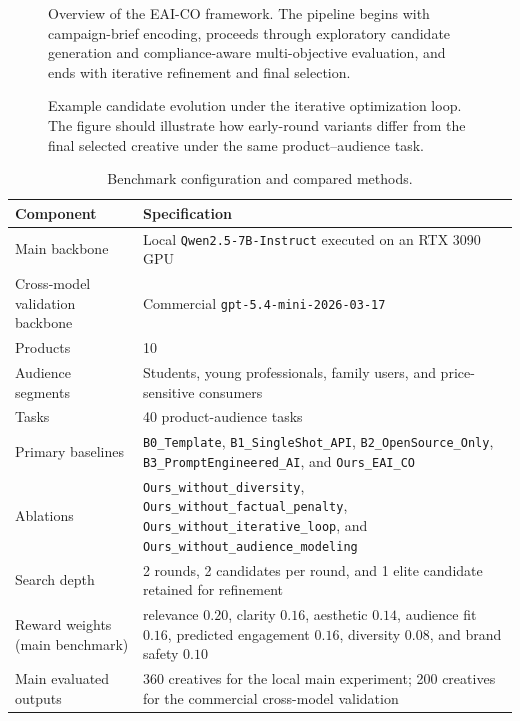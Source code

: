 \documentclass[applsci,article,submit,pdftex,moreauthors]{Definitions/mdpi}
\begin{document}
\begin{figure}[H]
\centering
\fbox{\rule{0pt}{2.0in}\rule{0.92\linewidth}{0pt}}
\caption{Overview of the EAI-CO framework. The pipeline begins with campaign-brief encoding, proceeds through exploratory candidate generation and compliance-aware multi-objective evaluation, and ends with iterative refinement and final selection.}
\label{fig:eai_co_pipeline}
\end{figure}

\begin{figure}[H]
\centering
\fbox{\rule{0pt}{2.0in}\rule{0.92\linewidth}{0pt}}
\caption{Example candidate evolution under the iterative optimization loop. The figure should illustrate how early-round variants differ from the final selected creative under the same product--audience task.}
\label{fig:candidate_evolution}
\end{figure}

\begin{table}[t]
\centering
\caption{Benchmark configuration and compared methods.}
\label{tab:benchmark_setup}
\begin{threeparttable}
\begin{tabular}{p{2.8cm} p{11.8cm}}
\toprule
Component & Specification \\
\midrule
Main backbone & Local \texttt{Qwen2.5-7B-Instruct} executed on an RTX 3090 GPU \\
Cross-model validation backbone & Commercial \texttt{gpt-5.4-mini-2026-03-17} \\
Products & 10 \\
Audience segments & Students, young professionals, family users, and price-sensitive consumers \\
Tasks & 40 product-audience tasks \\
Primary baselines & \texttt{B0\_Template}, \texttt{B1\_SingleShot\_API}, \texttt{B2\_OpenSource\_Only}, \texttt{B3\_PromptEngineered\_AI}, and \texttt{Ours\_EAI\_CO} \\
Ablations & \texttt{Ours\_without\_diversity}, \texttt{Ours\_without\_factual\_penalty}, \texttt{Ours\_without\_iterative\_loop}, and \texttt{Ours\_without\_audience\_modeling} \\
Search depth & 2 rounds, 2 candidates per round, and 1 elite candidate retained for refinement \\
Reward weights (main benchmark) & relevance $0.20$, clarity $0.16$, aesthetic $0.14$, audience fit $0.16$, predicted engagement $0.16$, diversity $0.08$, and brand safety $0.10$ \\
Main evaluated outputs & 360 creatives for the local main experiment; 200 creatives for the commercial cross-model validation \\
\bottomrule
\end{tabular}
\end{threeparttable}
\end{table}
\end{document}
